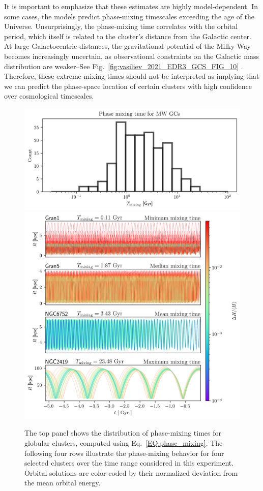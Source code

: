             It is important to emphasize that these estimates are highly model-dependent. In some cases, the models predict phase-mixing timescales exceeding the age of the Universe. Unsurprisingly, the phase-mixing time correlates with the orbital period, which itself is related to the cluster's distance from the Galactic center. At large Galactocentric distances, the gravitational potential of the Milky Way becomes increasingly uncertain, as observational constraints on the Galactic mass distribution are weaker--See Fig.~\ref{fig:vasiliev_2021_EDR3_GCS_FIG_10} \citep{2021MNRAS.505.5978V}. Therefore, these extreme mixing times should not be interpreted as implying that we can predict the phase-space location of certain clusters with high confidence over cosmological timescales. 



            \begin{figure}
                \centering
                \includegraphics[width=.75\linewidth]{images/phase_mixing_time_histogram_MWGCS.png}
                \includegraphics[width=\linewidth]{images/phase_mixing_orbital_errors_sample.png}
                \caption{The top panel shows the distribution of phase-mixing times for globular clusters, computed using Eq.~\ref{EQ:phase_mixing}. The following four rows illustrate the phase-mixing behavior for four selected clusters over the time range considered in this experiment. Orbital solutions are color-coded by their normalized deviation from the mean orbital energy.}
                \label{fig:phase_mixing_orbital_errors_sample}
            \end{figure}
     
